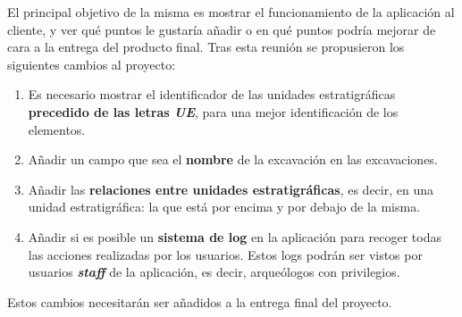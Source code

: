 El principal objetivo de la misma es mostrar el funcionamiento de la aplicación al cliente, y
ver qué puntos le gustaría añadir o en qué puntos podría mejorar de cara a la entrega del
producto final. Tras esta reunión se propusieron los siguientes cambios al proyecto:

    \begin{enumerate}
        \item Es necesario mostrar el identificador de las unidades estratigráficas
        \textbf{precedido de las letras \textit{UE}}, para una mejor identificación de los
        elementos.
        \item Añadir un campo que sea el \textbf{nombre} de la excavación en las
        excavaciones.
        \item Añadir las \textbf{relaciones entre unidades estratigráficas}, es decir, en una
        unidad estratigráfica: la que está por encima y por debajo de la misma.
        \item Añadir si es posible un \textbf{sistema de log} en la aplicación para recoger
        todas las acciones realizadas por los usuarios. Estos logs podrán ser vistos por
        usuarios \textbf{\textit{staff}} de la aplicación, es decir, arqueólogos con privilegios.
    \end{enumerate}

Estos cambios necesitarán ser añadidos a la entrega final del proyecto.
